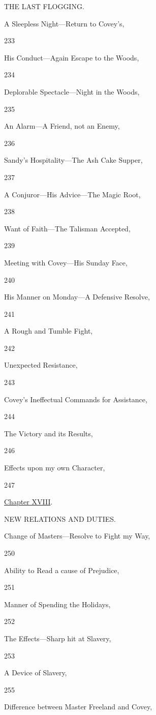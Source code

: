 THE LAST FLOGGING.

A Sleepless Night---Return to Covey's,

233

His Conduct---Again Escape to the Woods,

234

Deplorable Spectacle---Night in the Woods,

235

An Alarm---A Friend, not an Enemy,

236

Sandy's Hospitality---The Ash Cake Supper,

237

A Conjuror---His Advice---The Magic Root,

238

Want of Faith---The Talisman Accepted,

239

Meeting with Covey---His Sunday Face,

240

His Manner on Monday---A Defensive Resolve,

241

A Rough and Tumble Fight,

242

Unexpected Resistance,

243

Covey's Ineffectual Commands for Assistance,

244

The Victory and its Results,

246

Effects upon my own Character,

247

\href{/wiki/My_Bondage_and_My_Freedom_(1855)/Chapter_XVIII}{Chapter
XVIII}.

NEW RELATIONS AND DUTIES.

Change of Masters---Resolve to Fight my Way,

250

Ability to Read a cause of Prejudice,

251

Manner of Spending the Holidays,

252

The Effects---Sharp hit at Slavery,

253

A Device of Slavery,

255

Difference between Master Freeland and Covey,

